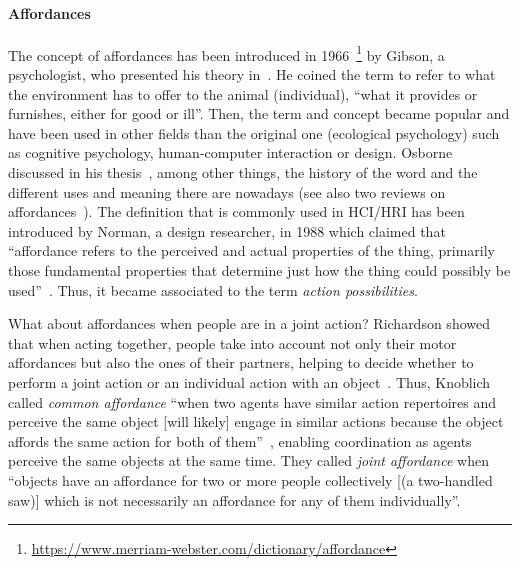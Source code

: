 \documentclass[a4paper,11pt,twoside]{StyleThese}
\begin{document}
\paragraph{Affordances}
The concept of affordances has been introduced in 1966~\footnote{\url{https://www.merriam-webster.com/dictionary/affordance}} by Gibson, a psychologist, who presented his theory in~\cite{gibson_1979_theory}. He coined the term to refer to what the environment has to offer to the animal (individual), ``what it provides or furnishes, either for good or ill''. Then, the term and concept became popular and have been used in other fields than the original one (ecological psychology) such as cognitive psychology, human-computer interaction or design. Osborne discussed in his thesis~\cite{osborne_2014_ecological}, among other things, the history of the word and the different uses and meaning there are nowadays (see also two reviews on affordances~\cite{jamone_2016_affordances, bach_2014_affordance}). The definition that is commonly used in HCI/HRI has been introduced by Norman, a design researcher, in 1988 which claimed that ``affordance refers to the perceived and actual properties of the thing, primarily those fundamental properties that determine just how the thing could possibly be used''~\cite[p.~9]{norman_1988_psychology}. Thus, it became associated to the term \textit{action possibilities}. 

What about affordances when people are in a joint action? Richardson \etal{} showed that when acting together, people take into account not only their motor affordances but also the ones of their partners, helping to decide whether to perform a joint action or an individual action with an object~\cite{richardson_2007_judging}. Thus, Knoblich \etal{} called \textit{common affordance} ``when two agents have similar action repertoires and perceive the same object [will likely] engage in similar actions because the object affords the same action for both of them''~\cite[p.~63]{knoblich_2011_joint}, enabling coordination as agents perceive the same objects at the same time. They called \textit{joint affordance} when ``objects have an affordance for two or more people collectively [(a two-handled saw)] which is not necessarily an affordance for any of them individually''.
\end{document}
